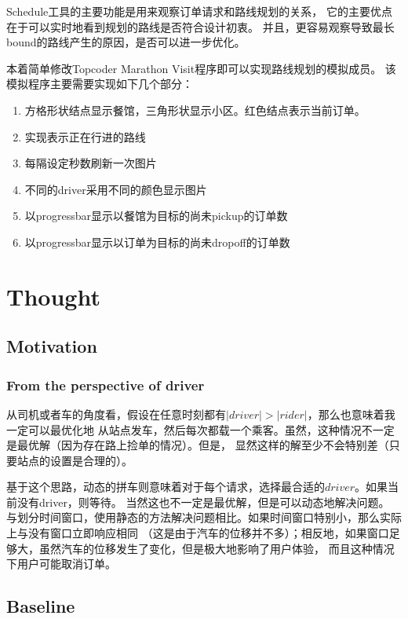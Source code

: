 \documentclass[hyperref,UTF8]{ctexart}
\theoremstyle{definition}
\theoremstyle{remark}
\numberwithin{equation}{subsection}
\begin{document}
Schedule工具的主要功能是用来观察订单请求和路线规划的关系，
它的主要优点在于可以实时地看到规划的路线是否符合设计初衷。
并且，更容易观察导致最长bound的路线产生的原因，是否可以进一步优化。

本着简单修改Topcoder Marathon Visit程序即可以实现路线规划的模拟成员。
该模拟程序主要需要实现如下几个部分：
\begin{enumerate}[(1)]
	\item 方格形状结点显示餐馆，三角形状显示小区。红色结点表示当前订单。
	\item 实现表示正在行进的路线
	\item 每隔设定秒数刷新一次图片
	\item 不同的driver采用不同的颜色显示图片
	\item 以progressbar显示以餐馆为目标的尚未pickup的订单数
	\item 以progressbar显示以订单为目标的尚未dropoff的订单数
\end{enumerate}

\section{Thought}
\label{sec:thought}

\subsection{Motivation}

\subsubsection{From the perspective of driver}

从司机或者车的角度看，假设在任意时刻都有$|driver| > |rider|$，那么也意味着我一定可以最优化地
从站点发车，然后每次都载一个乘客。虽然，这种情况不一定是最优解（因为存在路上捡单的情况）。但是，
显然这样的解至少不会特别差（只要站点的设置是合理的）。

基于这个思路，动态的拼车则意味着对于每个请求，选择最合适的$driver$。如果当前没有driver，则等待。
当然这也不一定是最优解，但是可以动态地解决问题。
与划分时间窗口，使用静态的方法解决问题相比。如果时间窗口特别小，那么实际上与没有窗口立即响应相同
（这是由于汽车的位移并不多）；相反地，如果窗口足够大，虽然汽车的位移发生了变化，但是极大地影响了用户体验，
而且这种情况下用户可能取消订单。


\subsection{Baseline}
\label{subsec:baseline}
	
\end{document}
